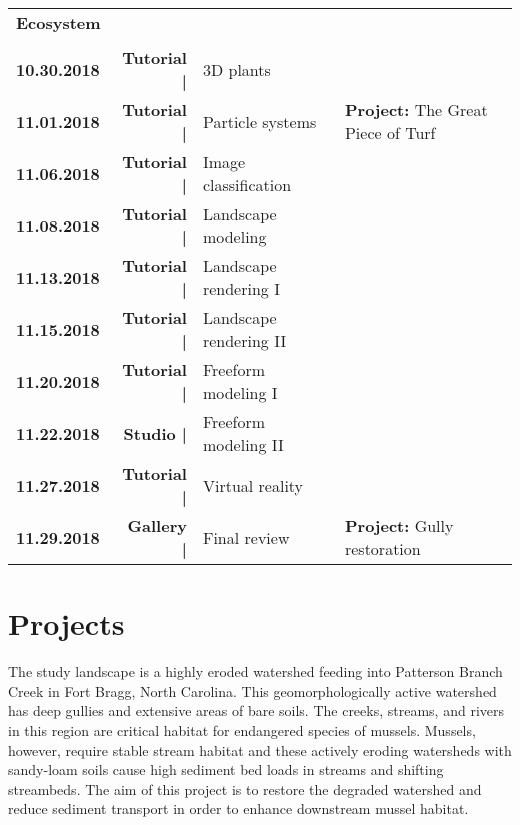\documentclass[11pt,article,oneside]{memoir}
\begin{document}
\begin{table}[H]
\begin{tabular}{l r @{\hskip 0.1cm} l @{\hskip 0.5cm} l}
\normalsize
\textbf{Ecosystem}\\
\small
\\
\textbf{10.30.2018} & \textbf{Tutorial |} & 3D plants \\
\textbf{11.01.2018} & \textbf{Tutorial |} & Particle systems & \textbf{Project:} The Great Piece of Turf \\
%
\textbf{11.06.2018} & \textbf{Tutorial |} & Image classification \\
\textbf{11.08.2018} & \textbf{Tutorial |} & Landscape modeling \\
%
\textbf{11.13.2018} & \textbf{Tutorial |} & Landscape rendering I \\
\textbf{11.15.2018} & \textbf{Tutorial |} & Landscape rendering II \\
%
\textbf{11.20.2018} & \textbf{Tutorial |} & Freeform modeling I \\
\textbf{11.22.2018} & \textbf{Studio |} & Freeform modeling II \\
%
\textbf{11.27.2018} & \textbf{Tutorial |} & Virtual reality\\
\textbf{11.29.2018} & \textbf{Gallery |} & Final review & \textbf{Project:} Gully restoration \\ 
%
\end{tabular}
\end{table}

\clearpage

%


\section{Projects}
The study landscape is a highly eroded watershed
feeding into Patterson Branch Creek in Fort Bragg, North Carolina.
This geomorphologically active watershed has deep gullies and
extensive areas of bare soils.
The creeks, streams, and rivers in this region are critical habitat
for endangered species of mussels.
Mussels, however, require stable stream habitat
and these actively eroding watersheds with sandy-loam soils
cause high sediment bed loads in streams and shifting streambeds.
The aim of this project is to restore the degraded watershed
and reduce sediment transport  
in order to enhance downstream mussel habitat.\\
\end{document}
